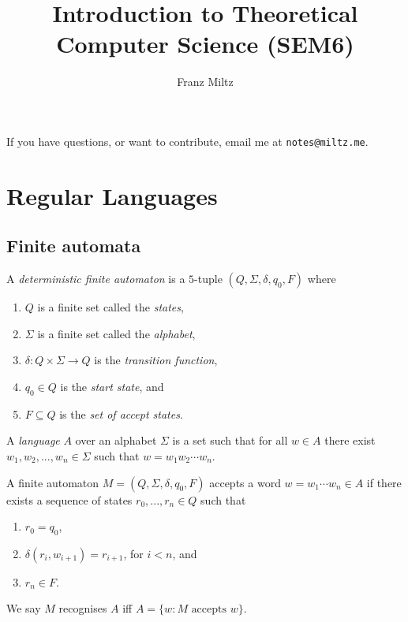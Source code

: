 \documentclass{article}
\title{Introduction to Theoretical Computer Science (SEM6)}
\author{Franz Miltz}
\begin{document}
\maketitle

\noindent If you have questions, or want to contribute, email me at \texttt{notes@miltz.me}.

\tableofcontents
\pagebreak

\section{Regular Languages}

\subsection{Finite automata}

\begin{definition*}
	A \emph{deterministic finite automaton} is a $5$-tuple $(Q,\Sigma,\delta,q_0,F)$ where
	\begin{enumerate}
		\item $Q$ is a finite set called the \emph{states},
		\item $\Sigma$ is a finite set called the \emph{alphabet},
		\item $\delta:Q\times\Sigma\to Q$ is the \emph{transition function},
		\item $q_0\in Q$ is the \emph{start state}, and
		\item $F\subseteq Q$ is the \emph{set of accept states}.
	\end{enumerate}
\end{definition*}

\begin{definition*}
	A \emph{language} $A$ over an alphabet $\Sigma$ is a set such that for all
	$w\in A$ there exist $w_1,w_2,...,w_n\in\Sigma$ such that $w=w_1w_2\cdots w_n$.

	A finite automaton $M=(Q,\Sigma,\delta,q_0,F)$ accepts a word $w=w_1\cdots w_n\in A$
	if there exists a sequence of states $r_0,...,r_n\in Q$ such that
	\begin{enumerate}
		\item $r_0=q_0$,
		\item $\delta(r_i,w_{i+1})=r_{i+1}$, for $i<n$, and
		\item $r_n\in F$.
	\end{enumerate}
	We say $M$ recognises $A$ iff $A=\{w : M\text{ accepts }w\}$.
\end{definition*}
\end{document}
